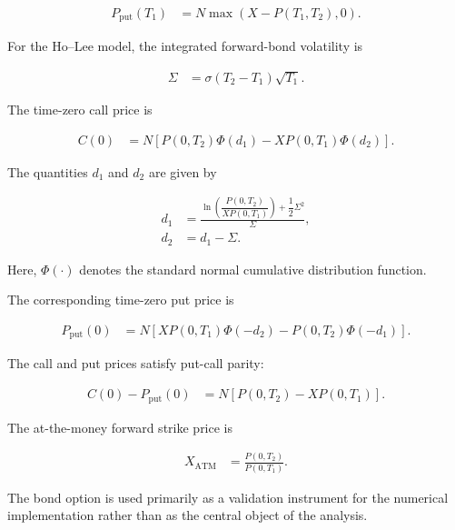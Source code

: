 \documentclass[11pt,a4paper]{article}
\numberwithin{equation}{section}
\begin{document}
\begin{align*}
    P_{\mathrm{put}}(T_1)
    &=
    N\max\left(X-P(T_1,T_2),0\right).
\end{align*}

For the Ho--Lee model, the integrated forward-bond volatility is

\begin{align*}
    \Sigma
    &=
    \sigma(T_2-T_1)\sqrt{T_1}.
\end{align*}

The time-zero call price is

\begin{align*}
    C(0)
    &=
    N
    \left[
        P(0,T_2)\Phi(d_1)
        -
        X P(0,T_1)\Phi(d_2)
    \right].
\end{align*}

The quantities $d_1$ and $d_2$ are given by

\begin{align*}
    d_1
    &=
    \frac{
        \ln
        \left(
            \dfrac{P(0,T_2)}
                  {X P(0,T_1)}
        \right)
        +
        \dfrac{1}{2}\Sigma^2
    }{\Sigma},
    \\
    d_2
    &=
    d_1-\Sigma.
\end{align*}

Here, $\Phi(\cdot)$ denotes the standard normal cumulative distribution
function.

The corresponding time-zero put price is

\begin{align*}
    P_{\mathrm{put}}(0)
    &=
    N
    \left[
        X P(0,T_1)\Phi(-d_2)
        -
        P(0,T_2)\Phi(-d_1)
    \right].
\end{align*}

The call and put prices satisfy put-call parity:

\begin{align*}
    C(0)-P_{\mathrm{put}}(0)
    &=
    N
    \left[
        P(0,T_2)-X P(0,T_1)
    \right].
\end{align*}

The at-the-money forward strike price is

\begin{align}
    X_{\mathrm{ATM}}
    &=
    \frac{P(0,T_2)}
         {P(0,T_1)}.
    \label{eq:atm_forward_strike}
\end{align}

The bond option is used primarily as a validation instrument for the
numerical implementation rather than as the central object of the
analysis.
\end{document}
